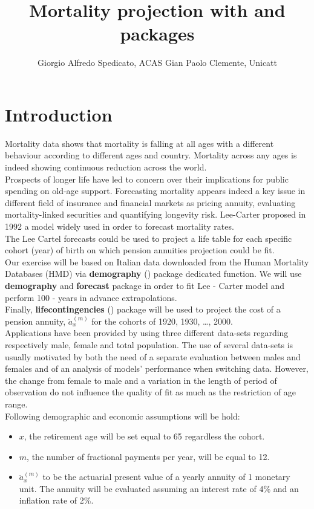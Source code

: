 \documentclass[nojss]{jss}
\author{Giorgio Alfredo Spedicato, ACAS \And 
        Gian Paolo Clemente, Unicatt}
\title{Mortality projection with \pkg{demography} and \pkg{lifecontingencies}
packages}
\begin{document}
\section{Introduction}
Mortality data shows that mortality is falling at all ages with a different behaviour according to different ages and country.
Mortality across any ages is indeed showing continuous reduction across the world. \\ 
Prospects of longer life have led to concern over their implications for public spending on old-age support. Forecasting mortality appears indeed a key issue in different field of insurance and financial markets as pricing annuity, evaluating mortality-linked securities and quantifying longevity risk. Lee-Carter proposed in 1992 a model widely used in order to forecast mortality rates.\\
The Lee Cartel forecasts could be used to project a life table for each specific cohort (year) of birth on which pension annuities projection could be fit.\\

Our exercise will be based on Italian data downloaded from the Human Mortality Databases (HMD) via \textbf{demography} (\cite{demographyR}) package dedicated function. We will use \textbf{demography} and \textbf{forecast} package in order to fit Lee - Carter model and perform 100 - years in advance extrapolations.\\
Finally, \textbf{lifecontingencies} (\cite{spedlifecon}) package will be used to project the cost of a pension annuity, $\ddot{a}_{x}^{(m)}$ for the cohorts of 1920, 1930, \ldots,
2000. \\ 
Applications have been provided by using three different data-sets regarding respectively male, female and total population.
The use of several data-sets is usually motivated by both the need of a separate evaluation between males and females and of an analysis of models' performance when switching data. However, the change from female to male and a variation in the length of period of observation do not influence the quality of fit as much as the restriction of age range.\\

Following demographic and economic assumptions will be hold:
\begin{itemize}
  \item $x$, the retirement age will be set equal to 65 regardless the cohort.
  \item $m$, the number of fractional payments per year, will be equal to 12.
  \item $\ddot{a}_{x}^{(m)}$ to be the actuarial present value of a yearly annuity of 1 monetary unit. The annuity will be evaluated assuming an interest rate of 4\% and an inflation rate of 2\%.
\end{itemize}
\end{document}
